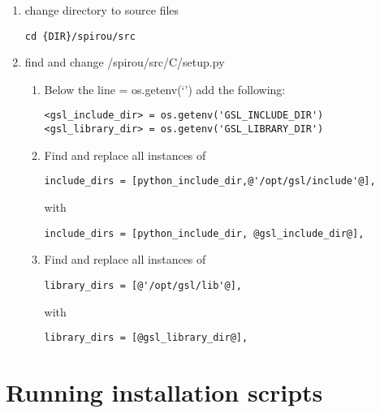 \begin{enumerate}
\item change directory to source files
\begin{lstlisting}[style=bashstyle]
cd {DIR}/spirou/src
\end{lstlisting}

\item find and change /spirou/src/C/setup.py

\begin{enumerate}
\item Below the line  = os.getenv(`') add the following:
\begin{lstlisting}[style=text]
<gsl_include_dir> = os.getenv('GSL_INCLUDE_DIR')
<gsl_library_dir> = os.getenv('GSL_LIBRARY_DIR')
\end{lstlisting}

\item Find and replace all instances of
\begin{lstlisting}[style=text]
include_dirs = [python_include_dir,@'/opt/gsl/include'@],
\end{lstlisting}

with
\begin{lstlisting}[style=text]
include_dirs = [python_include_dir, @gsl_include_dir@],
\end{lstlisting}

\item Find and replace all instances of 
\begin{lstlisting}[style=text]
library_dirs = [@'/opt/gsl/lib'@],  
\end{lstlisting}

with
\begin{lstlisting}[style=text]
library_dirs = [@gsl_library_dir@],
\end{lstlisting}

\end{enumerate}

\end{enumerate}

\section{Running installation scripts}
\label{section:running_install_Scripts}

